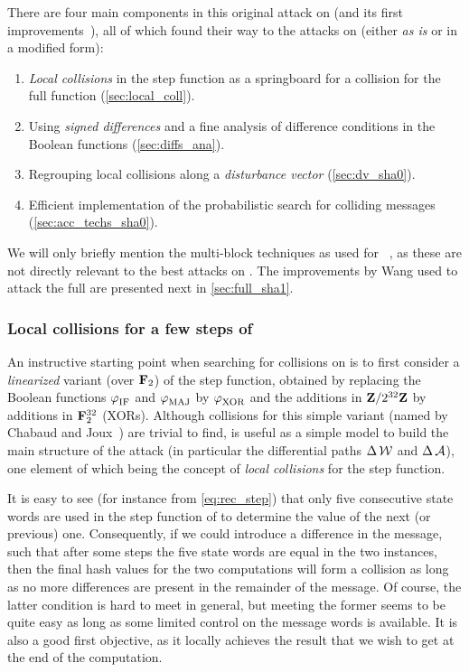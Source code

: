 There are four main components in this original attack on \shazero (and its first improvements~\cite{DBLP:conf/crypto/BihamC04,DBLP:conf/eurocrypt/BihamCJCLJ05,DBLP:journals/joc/BihamCJ15}),
all of which found their way to the attacks on \shaone (either \emph{as is} or in a modified form):
\begin{enumerate}
\item \emph{Local collisions} in the step function as a springboard for a collision for the full function (\autoref{sec:local_coll}).
\item Using \emph{signed differences} and a fine analysis of difference conditions in the Boolean functions (\autoref{sec:diffs_ana}).
\item Regrouping local collisions along a \emph{disturbance vector} (\autoref{sec:dv_sha0}).
\item Efficient implementation of the probabilistic search for colliding messages (\autoref{sec:acc_techs_sha0}).
\end{enumerate}

We will only briefly mention the multi-block techniques as used for \shazero~\cite{DBLP:conf/eurocrypt/BihamCJCLJ05,DBLP:journals/joc/BihamCJ15}, as these are not directly relevant to the best attacks on \shaone.
The improvements by Wang \etal used to attack the full \shaone are presented next in \autoref{sec:full_sha1}.

\subsubsection{Local collisions for a few steps of \sha}
\label{sec:local_coll}
An instructive starting point when searching for collisions on \sha is to first consider a \emph{linearized} variant (over $\mathbf{F}_{2}$) of the step function, obtained by replacing
the Boolean functions $\operatorname{\varphi}_\text{IF}$ and $\operatorname{\varphi}_\text{MAJ}$ by $\operatorname{\varphi}_\text{XOR}$ and the additions in $\mathbf{Z}/2^{32}\mathbf{Z}$ by additions in $\mathbf{F}_{2}^{32}$ (\ie XORs). Although collisions for this simple
variant (named \shiun by Chabaud and Joux~\cite{DBLP:conf/crypto/ChabaudJ98}) are trivial to find, \shiun is useful as a simple model to build the main structure of the attack
(in particular the differential paths $\operatorname{\Delta}\mathcal{W}$ and $\operatorname{\Delta}\mathcal{A}$),
one element of which being the concept of \emph{local collisions} for the step function.

It is easy to see (for instance from \autoref{eq:rec_step}) that only five consecutive state words are used in the step function of \sha to determine the value of the next (or previous) one. Consequently, if
we could introduce a difference in the message, such that after some steps the five state words are equal in the two instances, then the final hash values for the
two computations will form a collision
as long as no more differences are present in the remainder of the message. Of course, the latter condition is hard to meet in general, but meeting the former seems to be quite easy as long as some limited
control on the message words is available. It is also a good first objective, as it locally achieves the result that we wish to get at the end of the computation.

